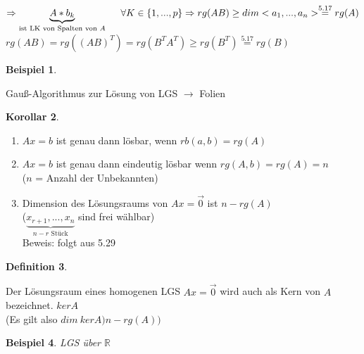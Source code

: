 \documentclass[a4paper,11pt]{article}
\newtheorem{definition}{Definition}[section]
\newtheorem{bsp}[definition]{Beispiel}
\newtheorem{koro}[definition]{Korollar}
\begin{document}
$\Rightarrow\underbrace{A*b_k}_{\text{ist LK von Spalten von }A}\hspace{5mm}\forall K\in\{1,...,p\} \\
\Rightarrow rg(AB)\geq dim<a_1,...,a_n>\overset{5.17}{=}rg(A)$ \\
$rg(AB)=rg((AB)^T)=rg(B^TA^T)\geq rg(B^T)\overset{5.17}{=}rg(B)$
\begin{bsp}
\end{bsp}
Gauß-Algorithmus zur Lösung von LGS $\rightarrow$ Folien
\begin{koro}
\end{koro}
\begin{enumerate}[label=\alph*)]
\item $Ax=b$ ist genau dann lösbar, wenn $rb(a,b)=rg(A)$ 
\item $Ax=b$ ist genau dann eindeutig lösbar wenn $rg(A,b)=rg(A)=n$ \\
($n$ = Anzahl der Unbekannten)
\item Dimension des Lösungsraums von $Ax=\overset{\rightarrow}{0}$ ist $n-rg(A)$ \\
($\underbrace{x_{r+1},...,x_n}_{n-r\text{ Stück}}$ sind frei wählbar) \\
Beweis: folgt aus 5.29
\end{enumerate}
\begin{definition}
\end{definition}
Der Lösungsraum eines homogenen LGS $Ax=\overset{\rightarrow}{0}$ wird auch als Kern von $A$ bezeichnet. $kerA$ \\
(Es gilt also $dim\:kerA)n-rg(A))$
\newpage
\begin{bsp}
LGS über $\mathbb{R}$
\end{bsp}
\end{document}
